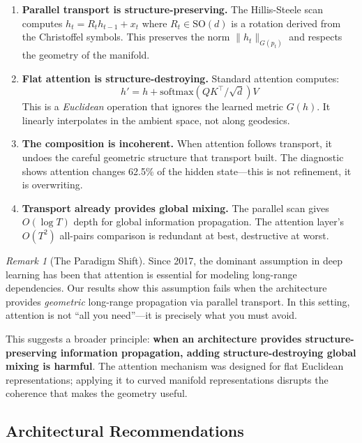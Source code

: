 \documentclass[11pt,a4paper]{article}
\theoremstyle{definition}
\theoremstyle{remark}
\newtheorem{remark}[theorem]{Remark}
\newcommand{\SO}{\mathrm{SO}}
\begin{document}
\begin{enumerate}[label=\textbf{(\arabic*)}]
    \item \textbf{Parallel transport is structure-preserving.} 
    The Hillis-Steele scan computes $h_t = R_t h_{t-1} + x_t$ where 
    $R_t \in \SO(d)$ is a rotation derived from the Christoffel 
    symbols. This preserves the norm $\|h_t\|_{G(p_t)}$ and 
    respects the geometry of the manifold.
    
    \item \textbf{Flat attention is structure-destroying.} 
    Standard attention computes:
    \[
    h' = h + \text{softmax}(QK^\top/\sqrt{d}) V
    \]
    This is a \emph{Euclidean} operation that ignores the 
    learned metric $G(h)$. It linearly interpolates in the 
    ambient space, not along geodesics.
    
    \item \textbf{The composition is incoherent.} When attention 
    follows transport, it undoes the careful geometric structure 
    that transport built. The diagnostic shows attention changes 
    62.5\% of the hidden state---this is not refinement, it is 
    overwriting.
    
    \item \textbf{Transport already provides global mixing.} 
    The parallel scan gives $O(\log T)$ depth for global 
    information propagation. The attention layer's $O(T^2)$ 
    all-pairs comparison is redundant at best, destructive at 
    worst.
\end{enumerate}

\begin{remark}[The Paradigm Shift]
Since 2017, the dominant assumption in deep learning has been 
that attention is essential for modeling long-range dependencies. 
Our results show this assumption fails when the architecture 
provides \emph{geometric} long-range propagation via parallel 
transport. In this setting, attention is not ``all you need''---it 
is precisely what you must avoid.

This suggests a broader principle: \textbf{when an architecture 
provides structure-preserving information propagation, adding 
structure-destroying global mixing is harmful}. The attention 
mechanism was designed for flat Euclidean representations; 
applying it to curved manifold representations disrupts the 
coherence that makes the geometry useful.
\end{remark}

\subsection{Architectural Recommendations}
\end{document}
